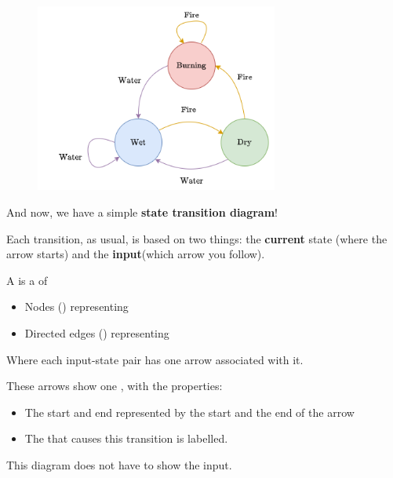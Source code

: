            \begin{figure}[H]
                \centering
                \includegraphics[width=80mm,scale=0.4]{images/rnn_images/std_fire_and_water.png}
            \end{figure}
            
            And now, we have a simple \textbf{state transition diagram}!
            
            Each transition, as usual, is based on two things: the \textbf{current} state (where the arrow starts) and the \textbf{input}(which arrow you follow).\\
            
            \begin{definition}
                A  is a  of 
                
                \begin{itemize}
                    \item Nodes () representing 
                    \item Directed edges () representing 
                \end{itemize}
                
                Where each input-state pair has one arrow associated with it.
                
                These arrows show one , with the properties:
                
                \begin{itemize}
                    \item The start and end  represented by the start and the end of the arrow
                    \item The  that causes this transition is labelled.
                \end{itemize}
                
                This diagram does not have to show the input.
            \end{definition}
            
